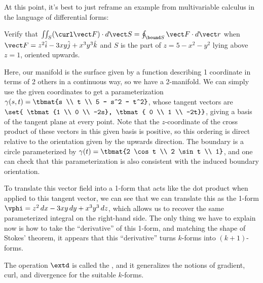 \documentclass[12pt]{article}
\begin{document}
At this point, it's best to just reframe an example from multivariable calculus in
the language of differential forms:  
\begin{problem}
  Verify that $\iint_S (\curl \vect F) \cdot d \vect S = \oint_{\bound S} \vect
  F \cdot d\vect r$ when $\vect F = z^2 \hat i - 3xy \hat j + x^3 y^3 \hat k$ and
  $S$ is the part of $z = 5 - x^2 - y^2$ lying above $z = 1$, oriented upwards.
\end{problem}
Here, our manifold is the surface given by a function describing 1 coordinate in
terms of 2 others in a continuous way, so we have a 2-manifold. We can simply
use the given coordinates to get a parameterization $\gamma(s, t) = \tbmat{s \\
  t \\ 5 - s^2 - t^2}$, whose tangent vectors are $\set{ \tbmat{1 \\ 0 \\ -2s},
  \tbmat{ 0 \\ 1 \\ -2t}}$, giving a basis of the tangent plane at every point.
  Note that the $z$-coordinate of the cross product of these vectors in this
  given basis is positive, so this
  ordering is direct relative to the orientation given by the upwards direction.
  The boundary is a circle parameterized by $\gamma(t) = \tbmat{2 \cos t \\ 2
  \sin t \\ 1}$, and one can check that this parameterization is also consistent
  with the induced boundary orientation. 

 To translate this vector field into a 1-form that acts like the dot product
 when applied to this tangent vector, we can see that we can translate this as
 the 1-form $\vphi = z^2 \, dx - 3xy \, dy + x^3 y^3 \, dz$, which allows us to
 recover the same parameterized integral on the right-hand side. The only thing
 we have to explain now is how to take the ``derivative'' of this 1-form, and
 matching the shape of Stokes' theorem, it appears that this ``derivative'' turns
 $k$-forms into $(k+1)$-forms.

 \noindent {} The
 operation $\extd$ is called the , and it generalizes
 the notions of gradient, curl, and divergence for the suitable $k$-forms. 
\end{document}

